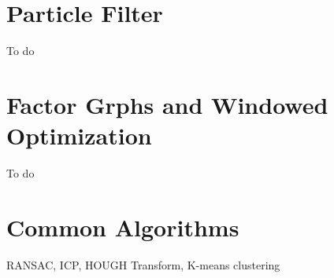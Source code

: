 \documentclass[a4paper,11pt]{article}
\begin{document}
\newpage


\newpage
\section{Particle Filter}
To do

\newpage
\section{Factor Grphs and Windowed Optimization}
To do

\newpage
\section{Common Algorithms}
RANSAC, ICP, HOUGH Transform, K-means clustering

\newpage


\end{document}
